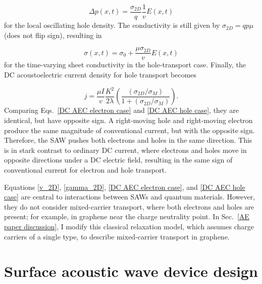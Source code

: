 \documentclass{beavtex_dub_edit}
\begin{document}
\begin{equation}
    \Delta p(x,t) = \frac{\sigma_{2D}}{q} \frac{1}{v}E(x,t)
\end{equation}
for the local oscillating hole density. The conductivity is still given by $\sigma_{2D} = q p \mu$ (does not flip sign), resulting in

\begin{equation}
    \sigma(x,t)= \sigma_0 + \frac{\mu \sigma_{2D}}{v}E(x,t)
\end{equation}
for the time-varying sheet conductivity in the hole-transport case. Finally, the DC acoustoelectric current density for hole transport becomes

\begin{equation}
    j = \frac{\mu I}{v} \frac{K^2}{2\lambda}(\frac{(\sigma_{2D}/\sigma_M)}{1+(\sigma_{2D}/\sigma_M)}). \label{DC AEC hole case}
\end{equation}
Comparing Eqs.\ \ref{DC AEC electron case} and \ref{DC AEC hole case}, they are identical, but have opposite sign. A right-moving hole and right-moving electron produce the same magnitude of conventional current, but with the opposite sign. Therefore, the SAW pushes both electrons and holes in the same direction. This is in stark contrast to ordinary DC current, where electrons and holes move in opposite directions under a DC electric field, resulting in the same sign of conventional current for electron and hole transport.

Equations \ref{v_2D}, \ref{gamma_2D}, \ref{DC AEC electron case}, and \ref{DC AEC hole case} are central to interactions between SAWs and quantum materials. However, they do not consider mixed-carrier transport, where both electrons and holes are present; for example, in graphene near the charge neutrality point. In Sec.\ \ref{AE paper discussion}, I modify this classical relaxation model, which assumes charge carriers of a single type, to describe mixed-carrier transport in graphene.


\section{Surface acoustic wave device design} \label{SAW device design}
\end{document}
